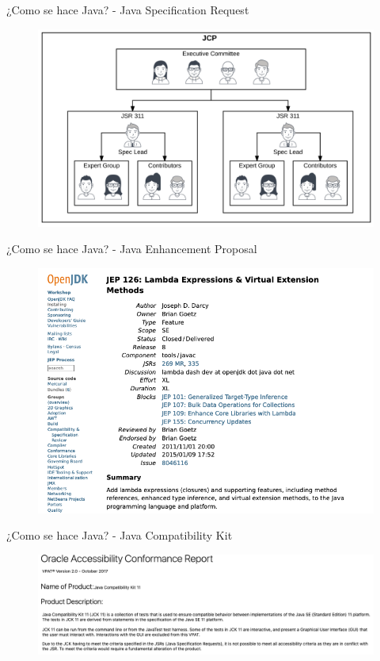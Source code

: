 \documentclass[aspectratio=169]{beamer}
\begin{document}
\begin{frame}[fragile]{¿Como se hace Java? - Java Specification Request}
	\begin{figure}
		\centering
		\includegraphics[width=0.9\linewidth]{Images/jcpjsr}
	\end{figure}

\end{frame}

\begin{frame}[fragile]{¿Como se hace Java? - Java Enhancement Proposal}
	\begin{figure}
		\centering
		\includegraphics[width=0.9\linewidth]{Images/jep}
	\end{figure}
	
\end{frame}

\begin{frame}[fragile]{¿Como se hace Java? - Java Compatibility Kit}
	\begin{figure}
		\centering
		\includegraphics[width=0.9\linewidth]{Images/jck}
	\end{figure}
	
\end{frame}
\end{document}

